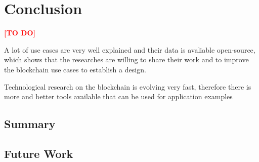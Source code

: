 

\section{Conclusion}
\label{sec:Conclusion}
\textcolor{red}{\textbf{[TO DO]}}

A lot of use cases are very well explained and their data is avaliable open-source, which shows that the researches are willing to share their work and to improve the blockchain use cases to establish a design.

Technological research on the blockchain is evolving very fast, therefore there is more and better tools available that can be used for application examples


\subsection{Summary}
\label{subsec:Summary}


\subsection{Future Work}
\label{subsec:FutureWork}